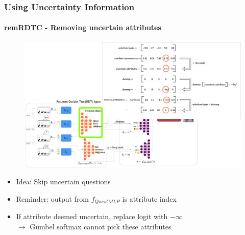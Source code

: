\documentclass[9pt]{beamer}
\begin{document}
\begin{frame}
\frametitle{Using Uncertainty Information}
\framesubtitle{\textbf{remRDTC} - Removing uncertain attributes}
\begin{figure}
	\includegraphics[width=0.8\linewidth]{images/how_to_remRDTC.pdf}
\end{figure}
\begin{itemize}
	\item Idea: Skip uncertain questions
	\item Reminder: output from $f_{QuestMLP}$ is attribute index %
	\item If attribute deemed uncertain, replace logit with $-\infty$\\ $\rightarrow$ Gumbel softmax cannot pick these attributes
\end{itemize}
\end{frame}
\end{document}
